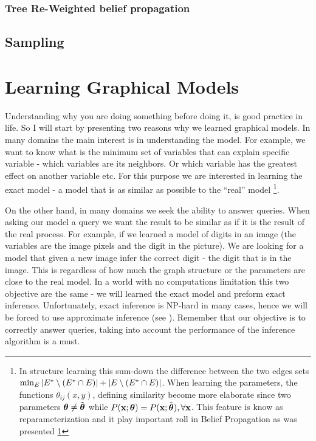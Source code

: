 \subsubsection{Tree Re-Weighted belief propagation}
\subsection{Sampling}
\label{sec:sampling}
\section{Learning Graphical Models}
Understanding why you are doing something before doing it, is good practice in life. 
So I will start by presenting two reasons why we learned graphical models.
In many domains the main interest is in understanding the model.
For example, we want to know what is the minimum set of variables that can explain specific variable - which variables are its neighbors.
Or which variable has the greatest effect on another variable etc.
For this purpose we are interested in learning the exact model - a model that is as similar as possible to the ``real'' model \footnote{
In structure learning this sum-down the difference between the two edges sets $ \min_{E} |{E}^{*}\setminus ({E}^{*} \cap E)| + |E \setminus ({E}^{*} \cap E)|$.
When learning the parameters, the functions $\theta_{ij}(x,y)$, defining similarity become more elaborate since two parameters $\boldsymbol{\theta} \neq \tilde{\boldsymbol{\theta}}$ while $P({\bf x}; \boldsymbol{\theta}) = P({\bf x}; \tilde{\boldsymbol{\theta}}), \forall {\bf x}$.
This feature is know as reparameterization and it play important roll in Belief Propagation as was presented \ref{}}.

On the other hand, in many domains we seek the ability to answer queries.
When asking our model a query we want the result to be similar as if it is the result of the real process.
For example, if we learned a model of digits in an image (the variables are the image pixels and the digit in the picture).
We are looking for a model that given a new image infer the correct digit - the digit that is in the image.
This is regardless of how much the graph structure or the parameters are close to the real model.
In a world with no computations limitation this two objective are the same - we will learned the exact model and preform exact inference.
Unfortunately, exact inference is NP-hard in many cases, hence we will be forced to use approximate inference (see ).
Remember that our objective is to correctly answer queries, taking into account the performance of the inference algorithm is a must.


